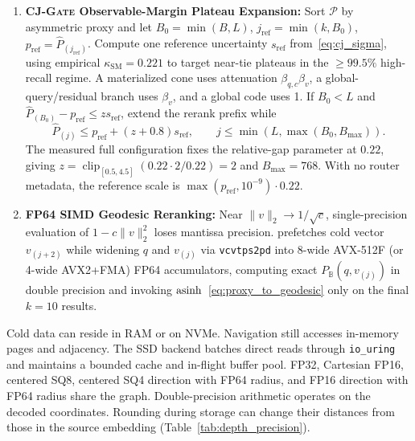 \begin{enumerate}
  \item \textbf{\textsc{CJ-Gate} Observable-Margin Plateau Expansion:}
  Sort $\mathcal P$ by asymmetric proxy and let $B_0=\min(B,L)$, $j_{\mathrm{ref}}=\min(k,B_0)$, $p_{\mathrm{ref}}=\widehat P_{(j_{\mathrm{ref}})}$. Compute one reference uncertainty $s_{\mathrm{ref}}$ from~\eqref{eq:cj_sigma}, using empirical $\kappa_{\mathrm{SM}}=0.221$ to target near-tie plateaus in the $\ge 99.5\%$ high-recall regime. A materialized cone uses attenuation $\beta_{q,c}\beta_v$, a global-query/residual branch uses $\beta_v$, and a global code uses 1.
  If $B_0<L$ and $\widehat P_{(B_0)}-p_{\mathrm{ref}}\le z s_{\mathrm{ref}}$, extend the rerank prefix while
  \begin{equation}
   \widehat P_{(j)}\le p_{\mathrm{ref}}+(z+0.8)s_{\mathrm{ref}},\qquad
   j\le\min(L,\max(B_0,B_{\max})).
  \end{equation}
  The measured full configuration fixes the relative-gap parameter at $0.22$, giving $z=\operatorname{clip}_{[0.5,4.5]}(0.22\cdot2/0.22)=2$ and $B_{\max}=768$. With no router metadata, the reference scale is $\max(p_{\mathrm{ref}},10^{-9})\cdot0.22$.

  \item \textbf{FP64 {SIMD} Geodesic Reranking:}
  Near $\|v\|_2 \to 1/\sqrt{c}$, single-precision evaluation of $1 - c\|v\|_2^2$ loses mantissa precision.
  \rquiver{} prefetches cold vector $v_{(j+2)}$ while widening $q$ and $v_{(j)}$ via \texttt{vcvtps2pd} into 8-wide {AVX-512F} (or 4-wide {AVX2+FMA}) FP64 accumulators, computing exact $P_{\mathbb{B}}(q, v_{(j)})$ in double precision and invoking $\operatorname{asinh}$~\eqref{eq:proxy_to_geodesic} only on the final $k = 10$ results.
\end{enumerate}

Cold data can reside in RAM or on NVMe. Navigation still accesses in-memory pages and adjacency. The SSD backend batches direct reads through \texttt{io\_uring} and maintains a bounded cache and in-flight buffer pool. FP32, Cartesian FP16, centered SQ8, centered SQ4 direction with FP64 radius, and FP16 direction with FP64 radius share the graph. Double-precision arithmetic operates on the decoded coordinates. Rounding during storage can change their distances from those in the source embedding (Table~\ref{tab:depth_precision}).
